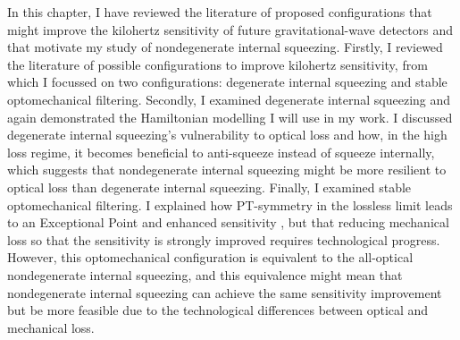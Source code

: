 In this chapter, I have reviewed the literature of proposed configurations that might improve the kilohertz sensitivity of future gravitational-wave detectors and that motivate my study of nondegenerate internal squeezing. Firstly, I reviewed the literature of possible configurations to improve kilohertz sensitivity, from which I focussed on two configurations: degenerate internal squeezing and stable optomechanical filtering. Secondly, I examined degenerate internal squeezing and again demonstrated the Hamiltonian modelling I will use in my work. I discussed degenerate internal squeezing's vulnerability to optical loss and how, in the high loss regime, it becomes beneficial to anti-squeeze instead of squeeze internally, which suggests that nondegenerate internal squeezing might be more resilient to optical loss than degenerate internal squeezing. 
Finally, I examined stable optomechanical filtering. %
I explained how PT-symmetry in the lossless limit leads to an Exceptional Point and enhanced sensitivity , but that reducing mechanical loss so that the sensitivity is strongly improved requires technological progress. However, this optomechanical configuration is equivalent to the all-optical nondegenerate internal squeezing, and this equivalence might mean that nondegenerate internal squeezing can achieve the same sensitivity improvement but be more feasible due to the technological differences between optical and mechanical loss.


